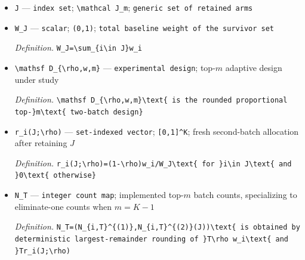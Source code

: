 \documentclass{article}
\begin{document}
\begin{itemize}
  \item \texttt{J} --- \texttt{index set}; \texttt{\textbackslash{}\allowbreak{}mathcal J\_\allowbreak{}m}; \texttt{generic set of retained arms}
  \item \texttt{W\_\allowbreak{}J} --- \texttt{scalar}; \texttt{(0,\allowbreak{}1)}; \texttt{total baseline weight of the survivor set}
  \par\smallskip\noindent\emph{Definition.} \texttt{W\_\allowbreak{}J=\allowbreak{}\textbackslash{}\allowbreak{}sum\_\allowbreak{}\{i\textbackslash{}\allowbreak{}in J\}\allowbreak{}w\_\allowbreak{}i}
  \item \texttt{\textbackslash{}\allowbreak{}mathsf D\_\allowbreak{}\{\textbackslash{}\allowbreak{}rho,\allowbreak{}w,\allowbreak{}m\}\allowbreak{}} --- \texttt{experimental design}; top-\(m\) adaptive design under study
  \par\smallskip\noindent\emph{Definition.} \texttt{\textbackslash{}\allowbreak{}mathsf D\_\allowbreak{}\{\textbackslash{}\allowbreak{}rho,\allowbreak{}w,\allowbreak{}m\}\allowbreak{}\textbackslash{}\allowbreak{}text\{ is the rounded proportional top-\allowbreak{}\}\allowbreak{}m\textbackslash{}\allowbreak{}text\{ two-\allowbreak{}batch design\}\allowbreak{}}
  \item \texttt{r\_\allowbreak{}i(J;\allowbreak{}\textbackslash{}\allowbreak{}rho)} --- \texttt{set-\allowbreak{}indexed vector}; \texttt{[0,\allowbreak{}1]\textasciicircum{}K}; fresh second-batch allocation after retaining \(J\)
  \par\smallskip\noindent\emph{Definition.} \texttt{r\_\allowbreak{}i(J;\allowbreak{}\textbackslash{}\allowbreak{}rho)=\allowbreak{}(1-\allowbreak{}\textbackslash{}\allowbreak{}rho)w\_\allowbreak{}i/\allowbreak{}W\_\allowbreak{}J\textbackslash{}\allowbreak{}text\{ for \}\allowbreak{}i\textbackslash{}\allowbreak{}in J\textbackslash{}\allowbreak{}text\{ and \}\allowbreak{}0\textbackslash{}\allowbreak{}text\{ otherwise\}\allowbreak{}}
  \item \texttt{N\_\allowbreak{}T} --- \texttt{integer count map}; implemented top-\(m\) batch counts, specializing to eliminate-one counts when \(m=K-1\)
  \par\smallskip\noindent\emph{Definition.} \texttt{N\_\allowbreak{}T=\allowbreak{}(N\_\allowbreak{}\{i,\allowbreak{}T\}\allowbreak{}\textasciicircum{}\{(1)\}\allowbreak{},\allowbreak{}N\_\allowbreak{}\{i,\allowbreak{}T\}\allowbreak{}\textasciicircum{}\{(2)\}\allowbreak{}(J))\textbackslash{}\allowbreak{}text\{ is obtained by deterministic largest-\allowbreak{}remainder rounding of \}\allowbreak{}T\textbackslash{}\allowbreak{}rho w\_\allowbreak{}i\textbackslash{}\allowbreak{}text\{ and \}\allowbreak{}Tr\_\allowbreak{}i(J;\allowbreak{}\textbackslash{}\allowbreak{}rho)}

\end{itemize}
\end{document}
